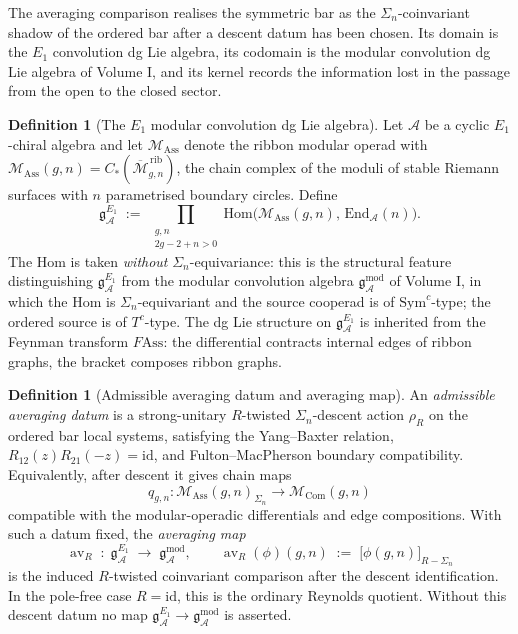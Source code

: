 \documentclass[11pt,reqno]{amsart}
\theoremstyle{definition}
\newtheorem{definition}[theorem]{Definition}
\theoremstyle{remark}
\newcommand{\cA}{\mathcal{A}}
\newcommand{\cM}{\mathcal{M}}
\newcommand{\Sym}{\mathrm{Sym}}
\newcommand{\Ass}{\mathrm{Ass}}
\newcommand{\Com}{\mathrm{Com}}
\newcommand{\Hom}{\mathrm{Hom}}
\newcommand{\End}{\mathrm{End}}
\newcommand{\gmod}{\mathfrak{g}^{\mathrm{mod}}_{\cA}}
\newcommand{\gEone}{\mathfrak{g}^{E_{1}}_{\cA}}
\newcommand{\av}{\operatorname{av}}
\newcommand{\id}{\mathrm{id}}
\numberwithin{equation}{section}
\begin{document}
The averaging comparison realises the symmetric bar as the
$\Sigma_{n}$-coinvariant shadow of the ordered bar after a descent
datum has been chosen. Its domain is the $E_{1}$ convolution dg Lie
algebra, its codomain is the modular convolution dg Lie algebra of
Volume I, and its kernel records the information lost in the passage
from the open to the closed sector.

\begin{definition}[The $E_{1}$ modular convolution dg Lie algebra]
\label{def:e1-convolution}
Let $\cA$ be a cyclic $E_{1}$-chiral algebra and let $\cM_{\Ass}$
denote the ribbon modular operad with $\cM_{\Ass}(g,n)
= C_{*}(\overline{\cM}_{g,n}^{\,\mathrm{rib}})$, the chain complex
of the moduli of stable Riemann surfaces with $n$ parametrised
boundary circles. Define
\begin{equation}
\label{eq:e1-convolution-hom}
\gEone
\;:=\;
\prod_{\substack{g,n \\ 2g-2+n > 0}}
\Hom\!\bigl(\cM_{\Ass}(g,n),\,\End_{\cA}(n)\bigr).
\end{equation}
The Hom is taken \emph{without} $\Sigma_{n}$-equivariance: this
is the structural feature distinguishing $\gEone$ from the
modular convolution algebra $\gmod$ of Volume I, in which the
Hom is $\Sigma_{n}$-equivariant and the source cooperad is of
$\Sym^{c}$-type; the ordered source is of $T^{c}$-type. The dg Lie structure
on $\gEone$ is inherited from the Feynman transform
$F\Ass$: the differential contracts internal edges of ribbon
graphs, the bracket composes ribbon graphs.
\end{definition}

\begin{definition}[Admissible averaging datum and averaging map]
\label{def:averaging-map}
An \emph{admissible averaging datum} is a strong-unitary
$R$-twisted $\Sigma_n$-descent action $\rho_R$ on the ordered bar
local systems, satisfying the Yang--Baxter relation,
$R_{12}(z)R_{21}(-z)=\id$, and Fulton--MacPherson boundary
compatibility. Equivalently, after descent it gives chain maps
\[
q_{g,n}\colon \cM_{\Ass}(g,n)_{\Sigma_n}
\longrightarrow \cM_{\Com}(g,n)
\]
compatible with the modular-operadic differentials and edge
compositions. With such a datum fixed, the \emph{averaging map}
\begin{equation}
\label{eq:averaging-map}
\av_R \;\colon\; \gEone \;\longrightarrow\; \gmod,
\qquad
\av_R(\phi)(g,n)
\;:=\;
\bigl[\phi(g,n)\bigr]_{R-\Sigma_n}
\end{equation}
is the induced $R$-twisted coinvariant comparison after the
descent identification. In the pole-free case $R=\id$, this is
the ordinary Reynolds quotient. Without this descent datum no map
\(\gEone\to\gmod\) is asserted.
\end{definition}
\end{document}
